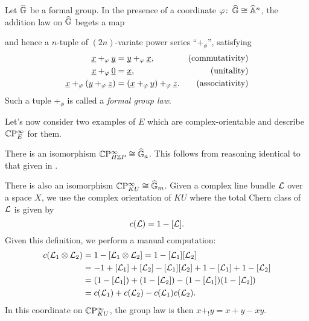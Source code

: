 \begin{definition}\label{FGLDefinition}
Let $\G$ be a formal group.  In the presence of a coordinate $\phi \co \G \cong \A^n$, the addition law on $\G$ begets a map
\begin{center}
\end{center}
and hence a $n$-tuple of $(2n)$-variate power series ``$+_\phi$'', satisfying
\begin{align*}
\underline{\smash x} +_\phi \underline{\smash y} & = \underline{\smash y} +_\phi \underline{\smash x}, & \text{(commutativity)} \\
\underline{\smash x} +_\phi \underline{\smash 0} & = \underline{\smash x}, & \text{(unitality)} \\
\underline{\smash x} +_\phi (\underline{\smash y} +_\phi \underline{\smash z}) & = (\underline{\smash x} +_\phi \underline{\smash y}) +_\phi \underline{\smash z}. & \text{(associativity)}
\end{align*}
Such a tuple $+_\phi$ is called a \textit{formal group law}.
\end{definition}

Let's now consider two examples of $E$ which are complex-orientable and describe $\CP^\infty_E$ for them.

\begin{example}
There is an isomorphism $\CP^\infty_{H\Z P} \cong \G_a$.  This follows from reasoning identical to that given in .
\end{example}

\begin{example}
There is also an isomorphism $\CP^\infty_{KU} \cong \G_m$.  Given a complex line bundle $\L$ over a space $X$, we use the complex orientation of $KU$ where the total Chern class of $\L$ is given by \[c(\L) = 1 - [\L].\]  Given this definition, we perform a manual computation:
\begin{align*}
c(\L_1 \otimes \L_2) & = 1 - [\L_1 \otimes \L_2] = 1 - [\L_1] [\L_2] \\
& = -1 + [\L_1] + [\L_2] - [\L_1] [\L_2] + 1 - [\L_1] + 1 - [\L_2] \\
& = (1 - [\L_1]) + (1 - [\L_2]) - (1 - [\L_1])(1 - [\L_2]) \\
& = c(\L_1) + c(\L_2) - c(\L_1) c(\L_2).
\end{align*}
In this coordinate on $\CP^\infty_{KU}$, the group law is then $x +_! y = x + y - xy$.
\end{example}

